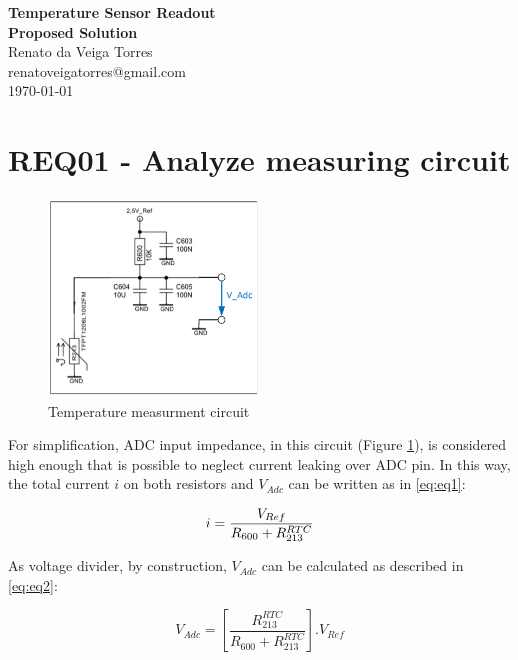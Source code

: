 \documentclass{article}
\makeatletter
\renewcommand{\maketitle}{
	\thispagestyle{coverpage}%
	\begin{titlepage}
		\centering
		\vspace*{2cm}
		\Huge{\textbf{Temperature Sensor Readout}}\\
		\huge{\textbf{Proposed Solution}}\\
		\vspace{1cm}
		\Large{Renato da Veiga Torres}\\
		\large{renatoveigatorres@gmail.com}\\
		\vspace{1cm}
		\today %
		\vfill
	\end{titlepage}
}
\makeatother
\begin{document}
	\maketitle
	
	\newpage %
	
	\section{REQ01 - Analyze measuring circuit}
	
	\begin{figure}[h]
		\centering %
		\includegraphics[width=0.5\textwidth]{fig/fig1.png}
		\caption{Temperature measurment circuit}
		\label{fig1}
	\end{figure}
	
	\Large For simplification, ADC input impedance, in this circuit (Figure \ref{fig1}), is considered high enough that is possible to neglect current leaking over ADC pin. In this way, the total current \(i\) on both resistors and \(V_{Adc}\) can be written as in \eqref{eq:eq1}:
		
	\begin{equation}
		\Large i = \frac{V_{Ref}}{R_{600} + R_{213}^{RTC}}
		\label{eq:eq1}
	\end{equation}
	
	As voltage divider, by construction, \(V_{Adc}\) can be calculated as described in \eqref{eq:eq2}:
	
	\begin{equation}
	 	V_{Adc} = \left [\frac{R_{213}^{RTC}}{R_{600} + R_{213}^{RTC}} \right ].V_{Ref}
	 	\label{eq:eq2}
	\end{equation}
	
\end{document}
